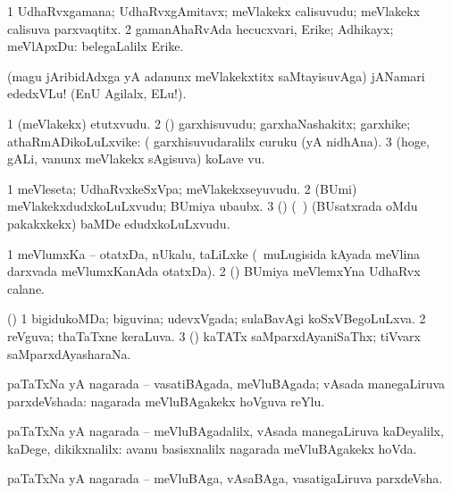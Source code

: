 \bentry
{} 
\gl{\nA}
\bmng
\bnum
\num{1} UdhaRvxgamana; UdhaRvxgAmitavx; meVlakekx calisuvudu; meVlakekx calisuva parxvaqtitx. 
\num{2} gamanAhaRvAda hecucxvari, Erike; Adhikayx; meVlApxDu:  belegaLalilx Erike. 
\enum
\emng
\eentry

\bentry
{} 
\gl{\BAavayx}
\expl{}
\bmng
(magu jAribidAdxga yA adanunx meVlakekxtitx saMtayisuvAga) jANamari ededxVLu! (EnU Agilalx, ELu!). 
\emng
\eentry

\bentry
{} 
\gl{\nA}
\expl{}
\bmng
\bnum
\num{1} (meVlakekx) etutxvudu. 
\num{2} (\AmA) garxhisuvudu; garxhaNashakitx; garxhike; athaRmADikoLuLxvike:  (  garxhisuvudaralilx curuku (yA nidhAna). 
\num{3} (hoge, gALi, \mo vanunx meVlakekx sAgisuva) koLave \mo vu. 
\enum
\emng
\eentry

\bentry
{} 
\gl{\nA}
\bmng
\bnum
\num{1} meVleseta; UdhaRvxkeSxVpa; meVlakekxseyuvudu. 
\num{2} (BUmi) meVlakekxdudxkoLuLxvudu; BUmiya ubaubx. 
\num{3} (\BUvi) (\kanmu\ \gaNi) (BUsatxrada oMdu pakakxkekx) baMDe edudxkoLuLxvudu. 
\enum
\emng
\eentry

\bentry
{} 
\gl{\nA}
\expl{}
\bmng
\bnum
\num{1} meVlumxKa -- otatxDa, nUkalu, taLiLxke (\udA\ muLugisida kAyada meVlina darxvada meVlumxKanAda otatxDa). 
\num{2} (\BUvi) BUmiya meVlemxYna UdhaRvx calane. 
\enum
\emng
\eentry

\bentry
{} 
\gl{\gu}
\expl{}
\bmng
(\AmA) 
\bnum
\num{1} bigidukoMDa; biguvina; udevxVgada; sulaBavAgi koSxVBegoLuLxva. 
\num{2} reVguva; thaTaTxne keraLuva. 
\num{3} (\ame) kaTATx saMparxdAyaniSaThx; tiVvarx saMparxdAyasharaNa. 
\enum
\emng
\eentry

\bentry
{} 
\gl{\gu}
\expl{}
\bmng
paTaTxNa yA nagarada -- vasatiBAgada, meVluBAgada; vAsada manegaLiruva parxdeVshada:  nagarada meVluBAgakekx hoVguva reYlu. 
\emng
\eentry

\bentry
{} 
\gl{\kirxvi}
\expl{}
\bmng
paTaTxNa yA nagarada -- meVluBAgadalilx, vAsada manegaLiruva kaDeyalilx, kaDege, dikikxnalilx:  avanu basisxnalilx nagarada meVluBAgakekx hoVda. 
\emng
\eentry

\bentry
{} 
\gl{\nA}
\expl{}
\bmng
paTaTxNa yA nagarada -- meVluBAga, vAsaBAga, vasatigaLiruva parxdeVsha. 
\emng
\eentry

